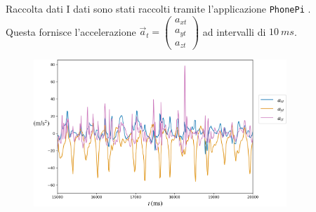 \documentclass{beamer}
\begin{document}
\begin{frame}{Raccolta dati}
I dati sono stati raccolti tramite l'applicazione \texttt{PhonePi} \cite{kumarPhonePiSampleServer2019}.\\
\smallskip
Questa fornisce l'accelerazione $\vec{a}_t = \begin{pmatrix}a_{xt} \\ a_{yt} \\ a_{zt}\end{pmatrix}$ ad intervalli di $\SI{10}{ms}$.
\pause
\begin{figure}[H]
\includegraphics[width=0.85\textwidth]{../figure/esempio-accel.png}
\end{figure}
\end{frame}
\end{document}
